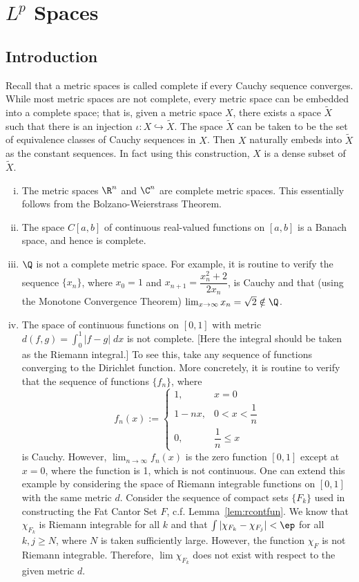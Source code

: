 \newpage
\section{$L^p$ Spaces}
\subsection{Introduction}

Recall that a metric spaces is called complete if every Cauchy sequence converges. While most metric spaces are not complete, every metric space can be embedded into a complete space; that is, given a metric space $X$, there exists a space $\widetilde{X}$ such that there is an injection $\iota: X \hookrightarrow \widetilde{X}$. The space $\widetilde{X}$ can be taken to be the set of equivalence classes of Cauchy sequences in $X$. Then $X$ naturally embeds into $\tilde{X}$ as the constant sequences. In fact using this construction, $X$ is a dense subset of $\widetilde{X}$. 


\begin{ex} \hfill
\begin{enumerate}[(i)]
\item The metric spaces $\R^n$ and $\C^n$ are complete metric spaces. This essentially follows from the Bolzano-Weierstrass Theorem. 
\item The space $C[a,b]$ of continuous real-valued functions on $[a,b]$ is a Banach space, and hence is complete.
\item $\Q$ is not a complete metric space. For example, it is routine to verify the sequence $\{x_n\}$, where $x_0=1$ and $x_{n+1}= \dfrac{x_n^2+2}{2x_n}$, is Cauchy and that (using the Monotone Convergence Theorem) $\lim_{x \to \infty} x_n= \sqrt{2} \notin \Q$. 
\item The space of continuous functions on $[0,1]$ with metric $d(f,g)= \int_0^1 |f-g| \; dx$ is not complete. [Here the integral should be taken as the Riemann integral.] To see this, take any sequence of functions converging to the Dirichlet function. More concretely, it is routine to verify that the sequence of functions $\{f_n\}$, where
	\[
	f_n(x):= 
	\begin{cases}
	1, &  x=0 \\
	1-nx, & 0<x< \dfrac{1}{n} \\
	0, & \dfrac{1}{n} \leq x
	\end{cases}
	\]
is Cauchy. However, $\lim_{n \to \infty} f_n(x)$ is the zero function $[0,1]$ except at $x=0$, where the function is 1, which is not continuous. One can extend this example by considering the space of Riemann integrable functions on $[0,1]$ with the same metric $d$. Consider the sequence of compact sets $\{F_k\}$ used in constructing the Fat Cantor Set $F$, c.f. Lemma~\ref{lem:rcontfun}. We know that $\chi_{F_k}$ is Riemann integrable for all $k$ and that $\int |\chi_{F_k} - \chi_{F_j}|<\ep$ for all $k,j \geq N$, where $N$ is taken sufficiently large. However, the function $\chi_F$ is not Riemann integrable. Therefore, $\lim \chi_{F_k}$ does not exist with respect to the given metric $d$. 
\end{enumerate}
\end{ex} \xqed 


